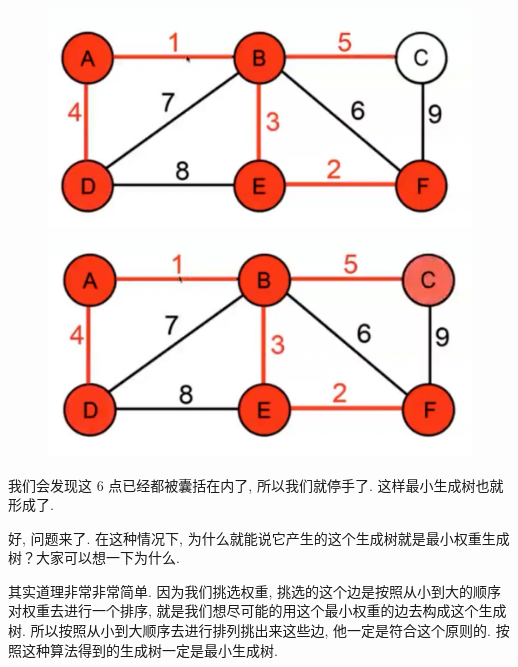 \begin{figure}[ht]
  \centering
  \begin{minipage}[t]{0.4\textwidth}
    \centering
    \caption{}
    \label{fig:img27_14}
    \includegraphics[width=\textwidth]{asset/01a127e3-24ba-4f89-8ce7-fe6fce090e4f.jpg}
  \end{minipage}%
  \hspace{1em}
  \begin{minipage}[t]{0.4\textwidth}
    \centering
    \caption{}
    \label{fig:img27_15}
    \includegraphics[width=\textwidth]{asset/9fef2b67-86cd-49ba-812d-a3e920ee59f3.jpg}
  \end{minipage}
\end{figure}

我们会发现这 6 点已经都被囊括在内了, 所以我们就停手了. 这样最小生成树也就形成了. 

好, 问题来了. 在这种情况下, 为什么就能说它产生的这个生成树就是最小权重生成树？大家可以想一下为什么. 

其实道理非常非常简单. 因为我们挑选权重, 挑选的这个边是按照从小到大的顺序对权重去进行一个排序, 就是我们想尽可能的用这个最小权重的边去构成这个生成树. 所以按照从小到大顺序去进行排列挑出来这些边, 他一定是符合这个原则的. 按照这种算法得到的生成树一定是最小生成树. 

